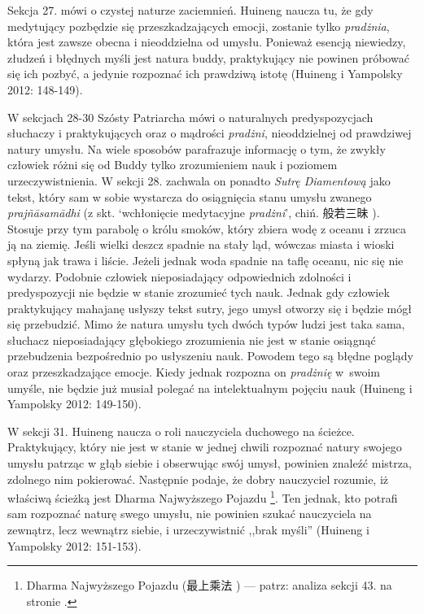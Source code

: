 Sekcja 27. mówi o czystej naturze zaciemnień.
Huineng naucza tu, że gdy medytujący pozbędzie się przeszkadzających emocji, zostanie tylko \textit{pradżnia}, która jest zawsze obecna i nieoddzielna od umysłu.
Ponieważ esencją niewiedzy, złudzeń i błędnych myśli jest natura buddy, praktykujący nie powinen próbować się ich pozbyć, a jedynie rozpoznać ich prawdziwą istotę
(Huineng i Yampolsky 2012: 148-149).

W sekcjach 28-30 Szósty Patriarcha mówi o naturalnych predyspozycjach słuchaczy i praktykujących oraz o mądrości \textit{pradżni}, nieoddzielnej od prawdziwej natury umysłu.
Na wiele sposobów parafrazuje informację o tym, że zwykły człowiek różni się od Buddy tylko zrozumieniem nauk i poziomem urzeczywistnienia.
W sekcji 28. zachwala on ponadto \textit{Sutrę Diamentową} jako tekst, który sam w sobie wystarcza do osiągnięcia stanu umysłu zwanego \textit{prajñāsamādhi} (z skt. `wchłonięcie medytacyjne \textit{pradżni}', chiń. 般若三昧 ).
Stosuje przy tym parabolę o królu smoków, który zbiera wodę z oceanu i zrzuca ją na ziemię.
Jeśli wielki deszcz spadnie na stały ląd, wówczas miasta i wioski spłyną jak trawa i liście.
Jeżeli jednak woda spadnie na taflę oceanu, nic się nie wydarzy.
Podobnie człowiek nieposiadający odpowiednich zdolności i predyspozycji nie będzie w stanie zrozumieć tych nauk.
Jednak gdy człowiek praktykujący mahajanę usłyszy tekst sutry, jego umysł otworzy się i będzie mógł się przebudzić.
Mimo że natura umysłu tych dwóch typów ludzi jest taka sama, słuchacz nieposiadający głębokiego zrozumienia nie jest w stanie osiągnąć przebudzenia bezpośrednio po usłyszeniu nauk.
Powodem tego są błędne poglądy oraz przeszkadzające emocje.
Kiedy jednak rozpozna on \textit{pradżnię} w~swoim umyśle, nie będzie już musiał polegać na intelektualnym pojęciu nauk
(Huineng i Yampolsky 2012: 149-150).

W sekcji 31. Huineng naucza o roli nauczyciela duchowego na ścieżce.
Praktykujący, który nie jest w stanie w jednej chwili rozpoznać natury swojego umysłu patrząc w głąb siebie i obserwując swój umysł, powinien znaleźć mistrza, zdolnego nim pokierować.
Następnie podaje, że dobry nauczyciel rozumie, iż właściwą ścieżką jest Dharma Najwyższego Pojazdu%
\footnote{Dharma Najwyższego Pojazdu (最上乘法 ) --- patrz: analiza sekcji 43. na stronie \pageref{SiChengFa}.}.
Ten jednak, kto potrafi sam rozpoznać naturę swego umysłu, nie powinien szukać nauczyciela na zewnątrz, lecz wewnątrz siebie, i urzeczywistnić ,,brak myśli''
(Huineng i Yampolsky 2012: 151-153).

